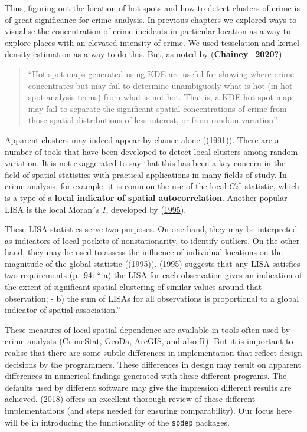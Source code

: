 \documentclass[
  krantz2]{krantz}
\begin{document}
Thus, figuring out the location of hot spots and how to detect clusters of crime is of great significance for crime analysis. In previous chapters we explored ways to visualise the concentration of crime incidents in particular location as a way to explore places with an elevated intensity of crime. We used tesselation and kernel density estimation as a way to do this. But, as noted by (\protect\hyperlink{ref-Chainey_2020}{\textbf{Chainey\_2020?}}):

\begin{quote}
``Hot spot maps generated using KDE are useful for showing where crime concentrates but may fail to determine unambiguosly what is hot (in hot spot analysis terms) from what is not hot. That is, a KDE hot spot map may fail to separate the significant spatial concentrations of crime from those spatial distributions of less interest, or from random variation''
\end{quote}

Apparent clusters may indeed appear by chance alone ((\protect\hyperlink{ref-Marshall_1991}{1991})). There are a number of tools that have been developed to detect local clusters among random variation. It is not exaggerated to say that this has been a key concern in the field of spatial statistics with practical applications in many fields of study. In crime analysis, for example, it is common the use of the local \(Gi^*\) statistic, which is a type of a \textbf{local indicator of spatial autocorrelation}. Another popular LISA is the local Moran´s \(I\), developed by (\protect\hyperlink{ref-Anselin_1995}{1995}).

These LISA statistics serve two purposes. On one hand, they may be interpreted as indicators of local pockets of nonstationarity, to identify outliers. On the other hand, they may be used to assess the influence of individual locations on the magnitude of the global statistic ((\protect\hyperlink{ref-Anselin_1995}{1995})). (\protect\hyperlink{ref-Anselin_1995}{1995}) suggests that any LISA satisfies two requirements (p.~94:
``-a) the LISA for each observation gives an indication of the extent of significant spatial clustering of similar values around that observation;
- b) the sum of LISAs for all observations is proportional to a global indicator of spatial association.''

These measures of local spatial dependence are available in tools often used by crime analysts (CrimeStat, GeoDa, ArcGIS, and also R). But it is important to realise that there are some subtle differences in implementation that reflect design decisions by the programmers. These differences in design may result on apparent differences in numerical findings generated with these different programs. The defaults used by different software may give the impression different results are achieved. (\protect\hyperlink{ref-Bivand_2018}{2018}) offers an excellent thorough review of these different implementations (and steps needed for ensuring comparability). Our focus here will be in introducing the functionality of the \texttt{spdep} packages.
\end{document}
